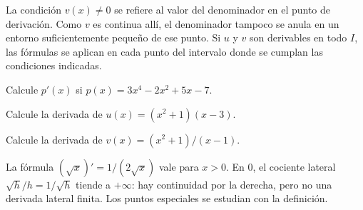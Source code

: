 \documentclass[10pt,a5paper]{article}
\newif\ifmostrarSoluciones
\begin{document}
La condición $v(x)\neq0$ se refiere al valor del denominador en el punto de derivación. Como $v$ es continua allí, el denominador tampoco se anula en un entorno suficientemente pequeño de ese punto. Si $u$ y $v$ son derivables en todo $I$, las fórmulas se aplican en cada punto del intervalo donde se cumplan las condiciones indicadas.

\begin{ejemplo}[linealidad]
Calcule $p'(x)$ si $p(x)=3x^4-2x^2+5x-7$.
\end{ejemplo}
\ifmostrarSoluciones
\begin{solucion}
Derivamos cada término:
\[
  p'(x)=12x^3-4x+5.
\]
El término constante $-7$ tiene derivada cero. Por ejemplo, $p'(1)=13$ es la pendiente en el punto de abscisa $1$, no el valor $p(1)$.
\end{solucion}
\else\vspace{14mm}\fi

\begin{ejemplo}
Calcule la derivada de $u(x)=(x^2+1)(x-3)$.
\end{ejemplo}
\ifmostrarSoluciones
\begin{solucion}
Se identifican los factores $f(x)=x^2+1$ y $g(x)=x-3$, con $f'(x)=2x$ y $g'(x)=1$. Como $u(x)=f(x)g(x)$, la regla del producto da
\[
  u'(x)=f'(x)g(x)+f(x)g'(x)
  =2x(x-3)+(x^2+1)\cdot1.
\]
Al simplificar, $u'(x)=3x^2-6x+1$.
También se verifica expandiendo primero: $u(x)=x^3-3x^2+x-3$. Multiplicar solamente $2x$ por $1$ no da la derivada del producto.
\end{solucion}
\else\vspace{16mm}\fi

\begin{ejemplo}
Calcule la derivada de $v(x)=(x^2+1)/(x-1)$.
\end{ejemplo}
\ifmostrarSoluciones
\begin{solucion}
El numerador $p(x)=x^2+1$ tiene derivada $p'(x)=2x$; el denominador $q(x)=x-1$ tiene derivada $q'(x)=1$. Para $x\neq1$, la regla del cociente da
\[
  v'(x)=\frac{p'(x)q(x)-p(x)q'(x)}{[q(x)]^2}
  =\frac{2x(x-1)-(x^2+1)}{(x-1)^2}.
\]
Así, $v'(x)=(x^2-2x-1)/(x-1)^2$.
La derivada de un cociente no es, en general, el cociente de las derivadas. En $1$ la función original no está definida y no se puede hablar de su derivada allí.
\end{solucion}
\else\vspace{18mm}\fi

\begin{nota}
La fórmula $(\sqrt{x})'=1/(2\sqrt{x})$ vale para $x>0$. En $0$, el cociente lateral $\sqrt{h}/h=1/\sqrt{h}$ tiende a $+\infty$: hay continuidad por la derecha, pero no una derivada lateral finita. Los puntos especiales se estudian con la definición.
\end{nota}
\end{document}
